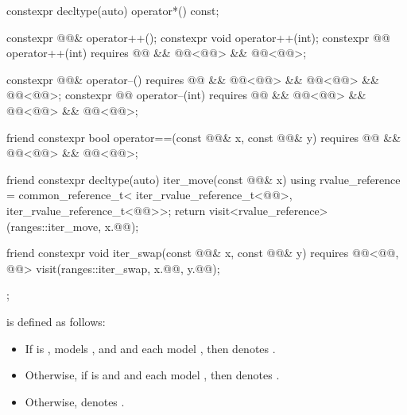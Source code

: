 \begin{codeblock}
{{    constexpr decltype(auto) operator*() const;

    constexpr @@& operator++();
    constexpr void operator++(int);
    constexpr @@ operator++(int)
      requires @@ && @@<@@> &&
               @@<@@>;

    constexpr @@& operator--()
      requires @@ && @@<@@> &&
               @@<@@> && @@<@@>;
    constexpr @@ operator--(int)
      requires @@ && @@<@@> &&
               @@<@@> && @@<@@>;

    friend constexpr bool operator==(const @@& x, const @@& y)
      requires @@ && @@<@@> &&
               @@<@@>;

    friend constexpr decltype(auto) iter_move(const @@& x) {
      using rvalue_reference = common_reference_t<
        iter_rvalue_reference_t<@@>,
        iter_rvalue_reference_t<@@>>;
      return visit<rvalue_reference>(ranges::iter_move, x.@@);
    }

    friend constexpr void iter_swap(const @@& x, const @@& y)
      requires @@<@@, @@> {
      visit(ranges::iter_swap, x.@@, y.@@);
    }
  };
}
\end{codeblock}

\pnum
{} is defined as follows:
\begin{itemize}
\item
If  is ,
 models , and
 and 
each model ,
then  denotes .
\item
Otherwise, if  is  and
 and  each model ,
then  denotes .
\item
Otherwise,  denotes .
\end{itemize}

